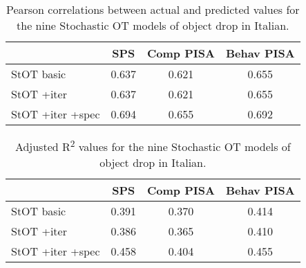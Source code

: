 \begin{table}[htb] %
\caption{Pearson correlations between actual and predicted values for the nine Stochastic OT models of object drop in Italian.}
\begin{tabular}{l|ccc}
& SPS & Comp PISA & Behav PISA \\
\hline
StOT basic           & 0.637        & 0.621     & 0.655      \\
StOT +iter           & 0.637        & 0.621     & 0.655      \\
StOT +iter +spec     & 0.694        & 0.655     & 0.692     
\end{tabular}
\end{table}

\begin{table}[htb] %
\caption{Adjusted R\textsuperscript{2} values for the nine Stochastic OT models of object drop in Italian.}
\begin{tabular}{l|ccc}
& SPS & Comp PISA & Behav PISA \\
\hline
StOT basic           & 0.391        & 0.370     & 0.414      \\
StOT +iter           & 0.386        & 0.365     & 0.410      \\
StOT +iter +spec     & 0.458        & 0.404     & 0.455     
\end{tabular}
\end{table}

